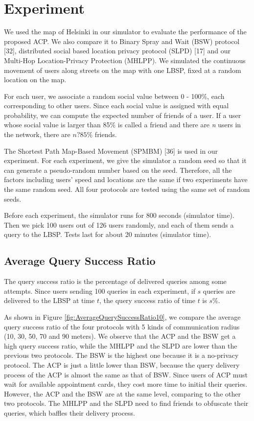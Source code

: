 
\section{ Experiment}

\noindent We used the map of Helsinki in our simulator to evaluate the performance of the proposed ACP. We also compare it to Binary Spray and Wait (BSW) protocol [32], distributed social based location privacy protocol (SLPD) [17] and our Multi-Hop Location-Privacy Protection (MHLPP). We simulated the continuous movement of users along streets on the map with one LBSP, fixed at a random location on the map.

For each user, we associate a random social value between 0 - 100\%, each corresponding to other users. Since each social value is assigned with equal probability, we can compute the expected number of friends of a user. If a user whose social value is larger than 85\% is called a friend and there are \textit{n} users in the network, there are $n\mathrm{?}85\%$ friends.

The Shortest Path Map-Based Movement (SPMBM) [36] is used in our experiment. For each experiment, we give the simulator a random seed so that it can generate a pseudo-random number based on the seed. Therefore, all the factors including users' speed and locations are the same if two experiments have the same random seed. All four protocols are tested using the same set of random seeds.

Before each experiment, the simulator runs for 800 seconds (simulator time). Then we pick 100 users out of 126 users randomly, and each of them sends a query to the LBSP. Tests last for about 20 minutes (simulator time). 


\subsection{  Average Query Success Ratio}

\noindent The query success ratio is the percentage of delivered queries among some attempts. Since users sending 100 queries in each experiment, if $s$ queries are delivered to the LBSP at time $t$, the query success ratio of time $t$ is $s\%$.

As shown in Figure \ref{fig:AverageQuerySuccessRatio10}, we compare the average query success ratio of the four protocols with 5 kinds of communication radius (10, 30, 50, 70 and 90 meters). We observe that the ACP and the BSW get a high query success ratio, while the MHLPP and the SLPD are lower than the previous two protocols. The BSW is the highest one because it is a no-privacy protocol. The ACP is just a little lower than BSW, because the query delivery process of the ACP is almost the same as that of BSW. Since users of ACP must wait for available appointment cards, they cost more time to initial their queries. However, the ACP and the BSW are at the same level, comparing to the other two protocols. The MHLPP and the SLPD need to find friends to obfuscate their queries, which baffles their delivery process.

